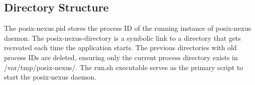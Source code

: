 \subsection{Directory Structure}

The posix-nexus.pid stores the process ID of the running instance of posix-nexus daemon.
The posix-nexus-directory is a symbolic link to a directory that gets recreated each time the application starts.
The previous directories with old process IDs are deleted, ensuring only the current process directory exists in /var/tmp/posix-nexus/.
The run.sh executable serves as the primary script to start the posix-nexus daemon.

